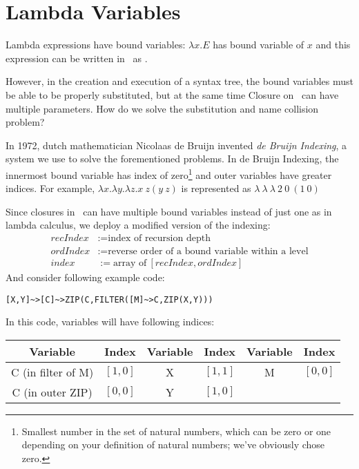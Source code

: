 \section{Lambda Variables}

Lambda expressions have bound variables: $\lambda x . E$ has bound variable of $x$ and this expression can be written in \tbas\ as .

However, in the creation and execution of a syntax tree, the bound variables must be able to be properly substituted, but at the same time Closure on \tbas\ can have multiple parameters. How do we solve the substitution and name collision problem?

In 1972, dutch mathematician Nicolaas de Bruijn invented \emph{de Bruijn Indexing}, a system we use to solve the forementioned problems. In de Bruijn Indexing, the innermost bound variable has index of zero\footnote{Smallest number in the set of natural numbers, which can be zero or one depending on your definition of natural numbers; we've obviously chose zero.} and outer variables have greater indices. For example, $\lambda x . \lambda y . \lambda z . x\ z (y\ z)$ is represented as $\lambda\ \lambda\ \lambda\ 2\ 0\ (1\ 0)$

Since closures in \tbas\ can have multiple bound variables instead of just one as in lambda calculus, we deploy a modified version of the indexing:
\begin{align*}
recIndex &:= \text{index of recursion depth}\\
ordIndex &:= \text{reverse order of a bound variable within a level}\\
index &:= \text{array of}\ [recIndex, ordIndex]
\end{align*}
And consider following example code:
\begin{lstlisting}
[X,Y]~>[C]~>ZIP(C,FILTER([M]~>C,ZIP(X,Y)))
\end{lstlisting}

In this code, variables will have following indices:

\begin{tabulary}{\textwidth}{cC|cC|cC}
Variable & Index & Variable & Index & Variable & Index \\
\hline
C {\condensedfont (in filter of M)} & $[1,0]$ & X & $[1,1]$ & M & $[0,0]$ \\
C {\condensedfont (in outer ZIP)} & $[0,0]$ & Y & $[1,0]$ & \ & \ \\
\end{tabulary}

